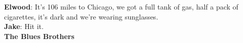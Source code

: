 \vspace*{\fill}
\begin{em}
	\noindent \textbf{Elwood}: It's 106 miles to Chicago, we got a full tank of gas, half a pack of cigarettes, it's dark and we're wearing sunglasses. \\
	\textbf{Jake}: Hit it. \\
	
	\textbf{The Blues Brothers}
\end{em}	
\vspace*{\fill}